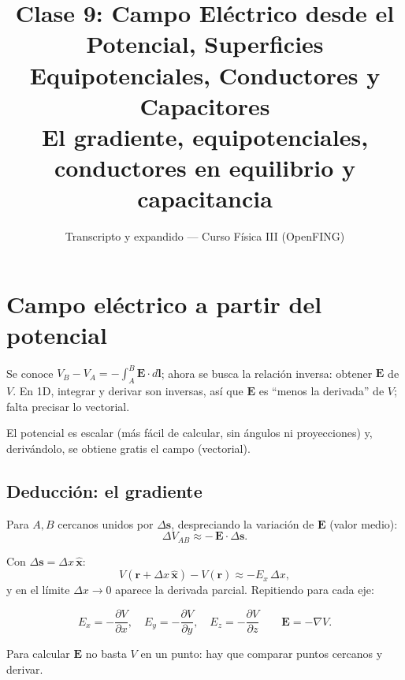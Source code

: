 \documentclass[12pt,a4paper]{article}
\title{\textbf{Clase 9: Campo Eléctrico desde el Potencial, Superficies \\
        Equipotenciales, Conductores y Capacitores}\\[0.3em]
        \large{El gradiente, equipotenciales, conductores en equilibrio
              y capacitancia}}
\author{Transcripto y expandido --- Curso Física III (OpenFING)}
\date{}
\begin{document}
\maketitle
\thispagestyle{empty}
\newpage

\tableofcontents
\newpage

\section{Campo eléctrico a partir del potencial}

Se conoce $V_B - V_A = -\int_A^B \mathbf{E}\cdot d\mathbf{l}$; ahora se
busca la relación inversa: obtener $\mathbf{E}$ de $V$. En 1D, integrar y
derivar son inversas, así que $\mathbf{E}$ es \enquote{menos la derivada}
de $V$; falta precisar lo vectorial.

\begin{notebox}
  El potencial es escalar (más fácil de calcular, sin ángulos ni
  proyecciones) y, derivándolo, se obtiene gratis el campo (vectorial).
\end{notebox}

\subsection{Deducción: el gradiente}

Para $A,B$ cercanos unidos por $\Delta\mathbf{s}$, despreciando la
variación de $\mathbf{E}$ (valor medio):
\[
\Delta V_{AB} \approx -\,\mathbf{E}\cdot\Delta\mathbf{s}.
\]

Con $\Delta\mathbf{s} = \Delta x\,\hat{\mathbf{x}}$:
\[
V(\mathbf{r}+\Delta x\,\hat{\mathbf{x}}) - V(\mathbf{r}) \approx -E_x\,\Delta x,
\]
y en el límite $\Delta x\to 0$ aparece la derivada parcial. Repitiendo
para cada eje:

\begin{keybox}
  \[
  \boxed{E_x = -\frac{\partial V}{\partial x},\quad
         E_y = -\frac{\partial V}{\partial y},\quad
         E_z = -\frac{\partial V}{\partial z}}
  \qquad \mathbf{E} = -\nabla V.
  \]
\end{keybox}

\begin{notebox}
  Para calcular $\mathbf{E}$ no basta $V$ en un punto: hay que comparar
  puntos cercanos y derivar.
\end{notebox}
\end{document}
